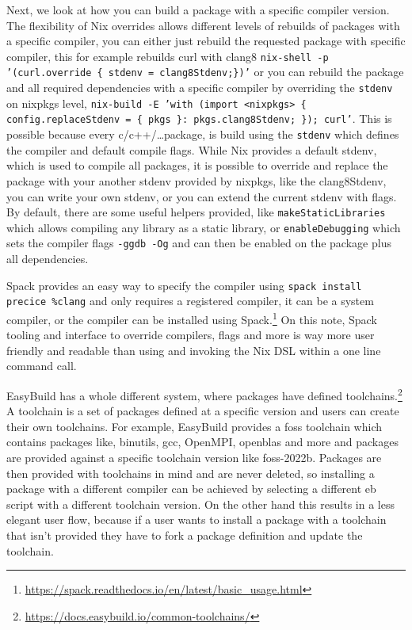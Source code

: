 \documentclass[conference,final,a4paper]{IEEEtran}
\begin{document}
Next, we look at how you can build a package with a specific compiler version.
The flexibility of Nix overrides allows different levels of rebuilds of packages with a specific compiler, you can either just rebuild the requested package with specific compiler, this for example rebuilds curl with clang8 \texttt{nix-shell -p '(curl.override \{ stdenv = clang8Stdenv;\})'} or you can rebuild the package and all required dependencies with a specific compiler by overriding the \texttt{stdenv} on nixpkgs level, \texttt{nix-build -E 'with (import <nixpkgs> \{ config.replaceStdenv = \{ pkgs \}: pkgs.clang8Stdenv; \}); curl'}.
This is possible because every c/c++/\ldots package, is build using the \texttt{stdenv} which defines the compiler and default compile flags.
While Nix provides a default stdenv, which is used to compile all packages, it is possible to override and replace the package with your another stdenv provided by nixpkgs, like the clang8Stdenv, you can write your own stdenv, or you can extend the current stdenv with flags.
By default, there are some useful helpers provided, like \texttt{makeStaticLibraries} which allows compiling any library as a static library, or \texttt{enableDebugging} which sets the compiler flags \texttt{-ggdb -Og} and can then be enabled on the package plus all dependencies.

Spack provides an easy way to specify the compiler using \texttt{spack install precice \%clang} and only requires a registered compiler, it can be a system compiler, or the compiler can be installed using Spack.\footnote{\url{https://spack.readthedocs.io/en/latest/basic_usage.html}}
On this note, Spack tooling and interface to override compilers, flags and more is way more user friendly and readable than using and invoking the Nix DSL within a one line command call.

EasyBuild has a whole different system, where packages have defined toolchains.\footnote{\url{https://docs.easybuild.io/common-toolchains/}}
A toolchain is a set of packages defined at a specific version and users can create their own toolchains.
For example, EasyBuild provides a foss toolchain which contains packages like, binutils, gcc, OpenMPI, openblas and more and packages are provided against a specific toolchain version like foss-2022b.
Packages are then provided with toolchains in mind and are never deleted, so installing a package with a different compiler can be achieved by selecting a different eb script with a different toolchain version.
On the other hand this results in a less elegant user flow, because if a user wants to install a package with a toolchain that isn't provided they have to fork a package definition and update the toolchain.\\
\end{document}
